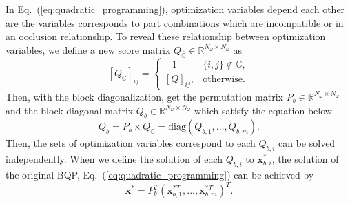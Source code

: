 \documentclass[10pt,twocolumn,letterpaper]{article}
\begin{document}
In Eq.~(\ref{eq:quadratic_programming}), optimization variables depend each other are the variables corresponds to part combinations which are incompatible or in an occlusion relationship.
To reveal these relationship between optimization variables, we define a new score matrix $Q_{\bar{\mathbb{C}}} \in \mathbb{R}^{N_{\omega} \times N_{\omega}}$ as
\begin{equation}
   \label{eq:Q_incompatible}
   [Q_{\bar{\mathbb{C}}}]_{ij} = 
   \begin{cases}
      -1        & \{i,j\} \notin \mathbb{C}, \\
      [Q]_{ij}, & \mathrm{otherwise}.
   \end{cases}
\end{equation}
Then, with the block diagonalization, get the permutation matrix $P_b \in \mathbb{R}^{N_{\omega} \times N_{\omega}}$ and the block diagonal matrix $Q_b \in \mathbb{R}^{N_{\omega} \times N_{\omega}}$ which satisfy the equation below
\begin{equation}
   \label{eq:Q_bd}
   Q_b = P_b \times Q_{\bar{\mathbb{C}}} = \mathrm{diag}(Q_{b,1},...,Q_{b,m}).
\end{equation}
Then, the sets of optimization variables correspond to each $Q_{b,i}$ can be solved independently.
When we define the solution of each $Q_{b,i}$ to $\mathbf{x}_{b,i}^*$, the solution of the original BQP, Eq.~(\ref{eq:quadratic_programming}) can be achieved by
\begin{equation}
   \label{eq:solution_merge}
   \mathbf{x}^* = P_b^T (\mathbf{x}_{b,1}^{*T}, ..., \mathbf{x}_{b,m}^{*T})^T.
\end{equation}
\end{document}
